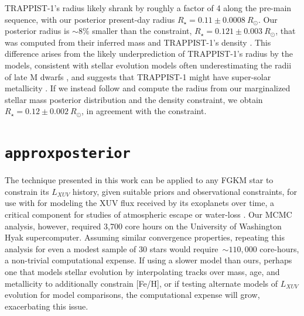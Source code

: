 \documentclass[twocolumn]{aastex62}
\newcommand{\approxposterior}[0]{\texttt{approxposterior}\xspace}
\begin{document}
TRAPPIST-1's radius likely shrank by roughly a factor of 4 along the pre-main sequence, with our posterior present-day radius $R_{\star} = 0.11 \pm{0.0008} \ R_{\odot}$. Our posterior radius is ${\sim} 8\%$ smaller than the \citet{vanGrootel2018} constraint, $R_{\star} = 0.121 \pm {0.003} \ R_{\odot}$, that was computed from their inferred mass and TRAPPIST-1's density \citep{Delrez2018}. This difference arises from the likely underprediction of TRAPPIST-1's radius by the \citet{Baraffe2015} models, consistent with stellar evolution models often underestimating the radii of late M dwarfs \citep{Reid2005,Spada2013,Jackson2019}, and suggests that TRAPPIST-1 might have super-solar metallicity \citep{Burgasser2017,vanGrootel2018}. If we instead follow \citet{vanGrootel2018} and compute the radius from our marginalized stellar mass posterior distribution and the \citet{Delrez2018} density constraint, we obtain $R_{\star} = 0.12 \pm{0.002} \ R_{\odot}$, in agreement with the \citet{vanGrootel2018} constraint.


\section{\approxposterior} \label{sec:approx}

The technique presented in this work can be applied to any FGKM star to constrain its $L_{XUV}$ history, given suitable priors \citep[e.g.][ for FGK stars]{Jackson2012} and observational constraints, for use with for modeling the XUV flux received by its exoplanets over time, a critical component for studies of atmospheric escape or water-loss \citep[e.g.][]{Lammer2003,MurrayClay2009,Luger2015,Airapetian2019}. Our MCMC analysis, however, required 3,700 core hours on the University of Washington Hyak supercomputer. Assuming similar convergence properties, repeating this analysis for even a modest sample of 30 stars would require~${\sim} 110,000$ core-hours, a non-trivial computational expense. If using a slower model than ours, perhaps one that models stellar evolution by interpolating tracks over mass, age, and metallicity to additionally constrain [Fe/H], or if testing alternate models of $L_{XUV}$ evolution for model comparisons, the computational expense will grow, exacerbating this issue.
\end{document}
